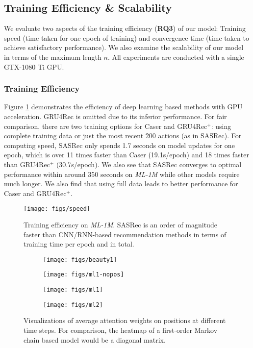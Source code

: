 \documentclass[conference]{IEEEtran}
\newcommand{\xhdr}[1]{\subsubsection*{\bf #1}}
\begin{document}
\subsection{Training Efficiency \& Scalability}

We evaluate two aspects of the training efficiency (\textbf{RQ3}) of our model: 
Training speed (time taken for one epoch of training) and convergence time (time taken to achieve satisfactory performance). 
We also 
examine
the scalability of our model in terms of the maximum length $n$. All experiments are conducted with a single GTX-1080 Ti GPU.


\xhdr{Training Efficiency} Figure \ref{fig:speed} demonstrates the efficiency of deep learning based methods with GPU acceleration. GRU4Rec is omitted due to its 
inferior
performance. For fair comparison, there are two training options for Caser and GRU4Rec$^{\text{+}}$: using 
complete
training data or just the most recent 200 actions (as in SASRec). 
For computing speed, SASRec only spends 1.7 seconds on model 
updates
for one epoch, which is over 11 times faster than Caser (19.1s/epoch) and 18 times faster than GRU4Rec$^{\text{+}}$ (30.7s/epoch). 
We also see that
SASRec 
converges to optimal 
performance within around 350 seconds on \emph{ML-1M} while other models require much 
longer.
We also find that
using full data 
leads to better
performance for Caser and GRU4Rec$^{\text{+}}$.

\begin{figure}[h]
\centering
\texttt{[image: figs/speed]}
\caption{Training efficiency on \emph{ML-1M}. 
SASRec is an order of magnitude faster than CNN/RNN-based recommendation methods in terms of training time per epoch and in total.}
\label{fig:speed}
\end{figure}


\begin{figure*}
\centering
\begin{subfigure}[b]{0.245\textwidth}
\texttt{[image: figs/beauty1]}
\end{subfigure}
\begin{subfigure}[b]{0.245\textwidth}
\texttt{[image: figs/ml1-nopos]}
\end{subfigure}
\begin{subfigure}[b]{0.245\textwidth}
\texttt{[image: figs/ml1]}
\end{subfigure}
\begin{subfigure}[b]{0.245\textwidth}
\texttt{[image: figs/ml2]}
\end{subfigure}
\caption{Visualizations of average attention weights on positions at different time steps. For comparison, the heatmap of a first-order Markov chain based model would be a diagonal matrix.}
\label{fig:vis_pos}
\end{figure*}  
\end{document}
